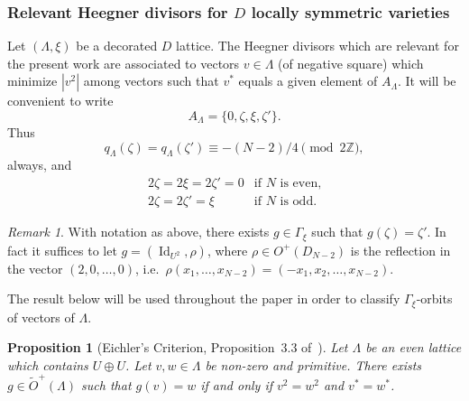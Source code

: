\documentclass[11pt]{amsart}
\numberwithin{equation}{subsection}
\theoremstyle{plain}
\newtheorem{proposition}[theorem]{Proposition}
\theoremstyle{remark}
\newtheorem{remark}[theorem]{Remark}
\theoremstyle{definition}
\def\Id{\operatorname{Id}}
\newcommand{\wt}{\widetilde}
\newcommand{\ZZ}{{\mathbb Z}}
\begin{document}
\subsubsection{Relevant Heegner divisors for $D$ locally symmetric varieties} 
%
Let $(\Lambda,\xi)$ be a decorated $D$ lattice. The Heegner divisors which are relevant for the present work are associated to vectors $v\in\Lambda$ (of negative square) which minimize $|v^2|$ among vectors such that $v^{*}$ equals a given element of $A_{\Lambda}$. It will be convenient to write
%
\begin{equation}
%
A_{\Lambda}=\{0,\zeta,\xi,\zeta'\}.
%
\end{equation}
%
Thus
%
\begin{equation}
%
q_{\Lambda}(\zeta)=q_{\Lambda}(\zeta')\equiv -(N-2)/4\pmod{2\ZZ},
%
\end{equation}
%
always, and
%
\begin{eqnarray}
%
2\zeta=2\xi=2\zeta'=0 & \text{if $N$ is even,}\\
%
2\zeta=2\zeta'=\xi & \text{if $N$ is odd.}
%
\end{eqnarray}
%
\begin{remark}\label{rmk:scambio}
%
With notation as above, there exists $g\in\Gamma_{\xi}$ such that $g(\zeta)=\zeta'$. In fact it suffices to let $g=(\Id_{U^2},\rho)$, where $\rho\in O^{+}(D_{N-2})$ is the reflection in the vector $(2,0,\ldots,0)$, i.e.~$\rho(x_1,\ldots,x_{N-2})=(-x_1,x_2,\ldots,x_{N-2})$. 
%
\end{remark}
%
The result below will be used throughout the paper in order to classify $\Gamma_{\xi}$-orbits of vectors of $\Lambda$.   
%
\begin{proposition}[Eichler's Criterion,  Proposition~3.3 of~\cite{ghs-abelianisation}]\label{prp:criteich}
%
Let $\Lambda$ be an even lattice which contains $U\oplus U$. Let $v,w\in \Lambda$ be non-zero and primitive. There exists $g\in\wt{O}^{+}(\Lambda)$ such that $g (v)=w$ if and only if $v^2=w^2$ and $v^{*}=w^{*}$. 
%
\end{proposition}
%
\end{document}
